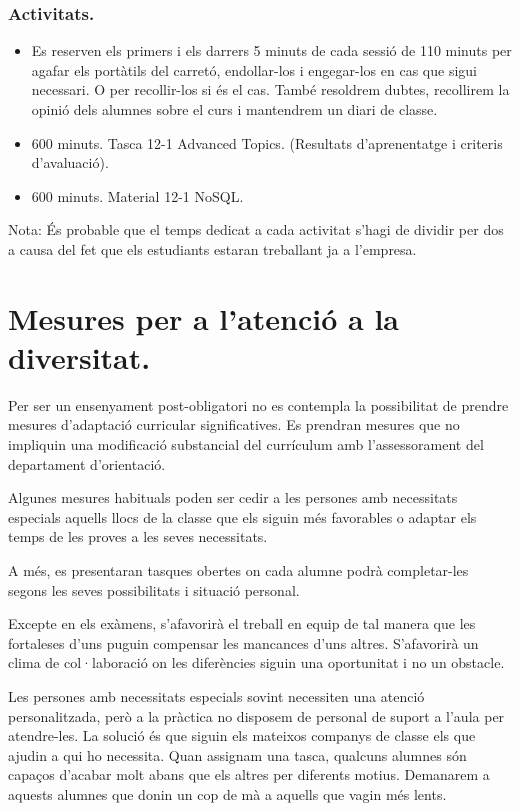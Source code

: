 \documentclass[catalan, a4paper, 12pt, titlepage]{article}
\begin{document}
  \subsubsection{Activitats.}
  \begin{itemize}
          \item Es reserven els primers i els darrers 5 minuts de cada sessió de 110 minuts per agafar els portàtils del carretó, endollar-los i engegar-los en cas que sigui necessari. O per recollir-los si és el cas. També resoldrem dubtes, recollirem la opinió dels alumnes sobre el curs i mantendrem un diari de classe.
	  \item 600 minuts. Tasca 12-1 Advanced Topics. (\faGraduationCap Resultats d'aprenentatge i criteris d'avaluació).
	  \item 600 minuts. Material 12-1 NoSQL.
  \end{itemize}

  Nota: És probable que el temps dedicat a cada activitat s'hagi de dividir per dos a causa del fet que els estudiants estaran treballant ja a l'empresa.


\section{Mesures per a l'atenció a la diversitat.}
\label{sec:diversitat}

Per ser un ensenyament post-obligatori no es contempla la possibilitat de prendre mesures d'adaptació curricular significatives. Es prendran mesures que no impliquin una modificació substancial del currículum amb l'assessorament del departament d'orientació.

Algunes mesures habituals poden ser cedir a les persones amb necessitats especials aquells llocs de la classe que els siguin més favorables o adaptar els temps de les proves a les seves necessitats.

A més, es presentaran tasques obertes on cada alumne podrà completar-les segons les seves possibilitats i situació personal.

Excepte en els exàmens, s'afavorirà el treball en equip de tal manera que les fortaleses d'uns puguin compensar les mancances d'uns altres. S'afavorirà un clima de col·laboració on les diferències siguin una oportunitat i no un obstacle.

Les persones amb necessitats especials sovint necessiten una atenció personalitzada, però a la pràctica no disposem de personal de suport a l'aula per atendre-les.
La solució és que siguin els mateixos companys de classe els que ajudin a qui ho necessita.
Quan assignam una tasca, qualcuns alumnes són capaços d'acabar molt abans que els altres per diferents motius.
Demanarem a aquests alumnes que donin un cop de mà a aquells que vagin més lents.
\end{document}
